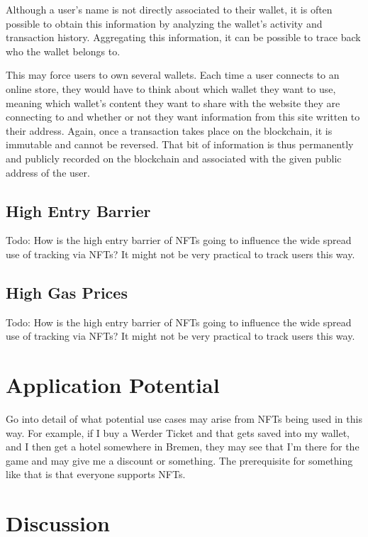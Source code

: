 Although a user's name is not directly associated to their wallet, it is often possible to obtain this information by analyzing the wallet's activity and transaction history. Aggregating this information, it can be possible to trace back who the wallet belongs to.

This may force users to own several wallets. Each time a user connects to an online store, they would have to think about which wallet they want to use, meaning which wallet's content they want to share with the website they are connecting to and whether or not they want information from this site written to their address. Again, once a transaction takes place on the blockchain, it is immutable and cannot be reversed. That bit of information is thus permanently and publicly recorded on the blockchain and associated with the given public address of the user.


%
%
\subsection{High Entry Barrier}
\label{sub:results:barrier}
Todo: How is the high entry barrier of NFTs going to influence the wide spread use of tracking via NFTs? It might not be very practical to track users this way.

%
%
\subsection{High Gas Prices}
\label{sub:results:barrier}
Todo: How is the high entry barrier of NFTs going to influence the wide spread use of tracking via NFTs? It might not be very practical to track users this way.


%
%
\section{Application Potential}
\label{sec:results:potential}
Go into detail of what potential use cases may arise from NFTs being used in this way. For example, if I buy a Werder Ticket and that gets saved into my wallet, and I then get a hotel somewhere in Bremen, they may see that I'm there for the game and may give me a discount or something. The prerequisite for something like that is that everyone supports NFTs.



%
%
\section{Discussion}
\label{sec:results:discussion}
